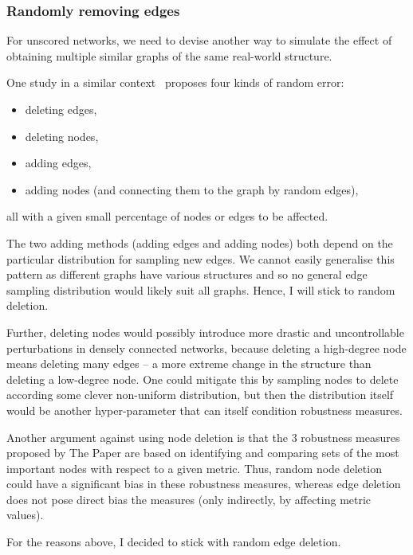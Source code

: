 
\subsubsection{Randomly removing edges}\label{sec:randomly_removing_edges}

For unscored networks, we need to devise another way to simulate the effect of obtaining multiple similar graphs of the same real-world structure.

One study in a similar context~\cite{BorgattiRobustnessCentralityMeasures2006} proposes four kinds of random error:
\begin{itemize}[topsep=5pt]
    \item deleting edges,
    \item deleting nodes,
    \item adding edges,
    \item adding nodes (and connecting them to the graph by random edges),
\end{itemize}
all with a given small percentage of nodes or edges to be affected.

The two adding methods (adding edges and adding nodes) both depend on the particular distribution for sampling new edges.
We cannot easily generalise this pattern as different graphs have various structures and so no general edge sampling distribution would likely suit all graphs.
Hence, I will stick to random deletion.

Further, deleting nodes would possibly introduce more drastic and uncontrollable perturbations in densely connected networks, because deleting a high-degree node means deleting many edges -- a more extreme change in the structure than deleting a low-degree node.
One could mitigate this by sampling nodes to delete according some clever non-uniform distribution, but then the distribution itself would be another hyper-parameter that can itself condition robustness measures.

Another argument against using node deletion is that the 3 robustness measures proposed by The Paper are based on identifying and comparing sets of the most important nodes with respect to a given metric.
Thus, random node deletion could have a significant bias in these robustness measures, whereas edge deletion does not pose direct bias the measures (only indirectly, by affecting metric values).

For the reasons above, I decided to stick with random edge deletion.

